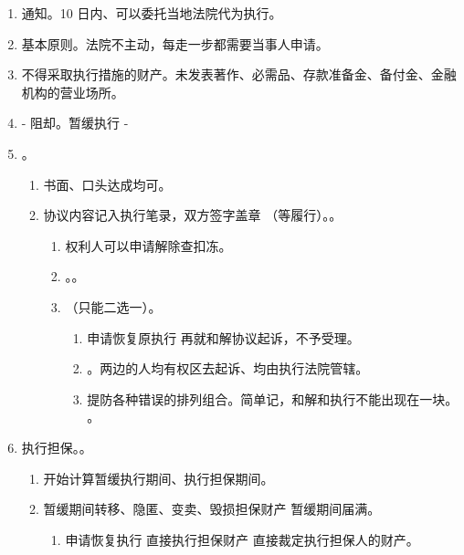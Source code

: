 \begin{enumerate}
  \item 通知。10 日内、可以委托当地法院代为执行。
  \item 基本原则。法院不主动，每走一步都需要当事人申请。
  \item 不得采取执行措施的财产。未发表著作、必需品、存款准备金、备付金、金融机构的营业场所。
  \item - 阻却。暂缓执行 -
  \item {}。
        \begin{enumerate}
          \item 书面、口头达成均可。
          \item 协议内容记入执行笔录，双方签字盖章 \yjt {}（等履行）。。
                \begin{enumerate}
                  \item 权利人可以申请解除查扣冻。
                  \item {}。。
                  \item {}（只能二选一）。
                        \begin{enumerate}
                          \item 申请恢复原执行 \yjt 再就和解协议起诉，不予受理。
                          \item {}。两边的人均有权区去起诉、均由执行法院管辖。
                          \item 提防各种错误的排列组合。简单记，和解和执行不能出现在一块。
                                。
                        \end{enumerate}
                \end{enumerate}
        \end{enumerate}
  \item 执行担保。。
        \begin{enumerate}
          \item 开始计算暂缓执行期间、执行担保期间。
          \item 暂缓期间转移、隐匿、变卖、毁损担保财产 \hz 暂缓期间届满。
                \begin{enumerate}
                  \item 申请恢复执行 \yjt 直接执行担保财产 \hz 直接裁定执行担保人的财产。

\end{enumerate}
\end{enumerate}
\end{enumerate}
